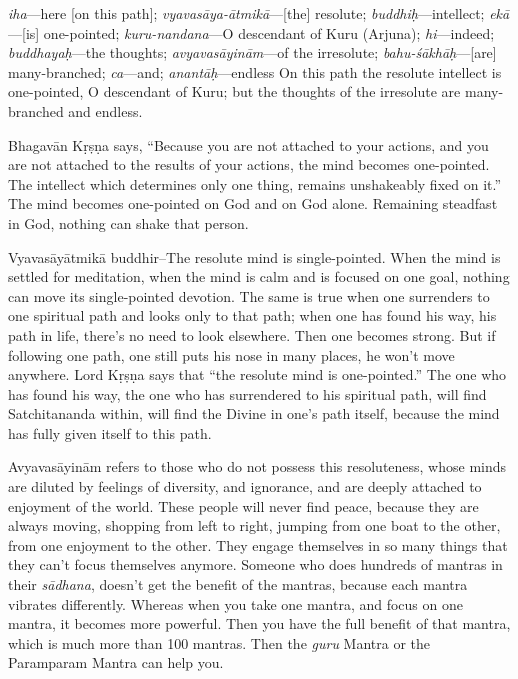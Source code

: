 {%
  \textit{iha}---here [on this path]; 
  \textit{vyavasāya-ātmikā}---[the] resolute; 
  \textit{buddhiḥ}---intellect; 
  \textit{ekā}---[is] one-pointed; 
  \textit{kuru-nandana}---O descendant of Kuru (Arjuna); 
  \textit{hi}---indeed; 
  \textit{buddhayaḥ}---the thoughts; 
  \textit{avyavasāyinām}---of the irresolute; 
  \textit{bahu-śākhāḥ}---[are] many-branched; 
  \textit{ca}---and; 
  \textit{anantāḥ}---endless
}
{%
  On this path the resolute intellect is one-pointed, O descendant of Kuru; but the thoughts of the irresolute are many-branched and endless.
}

Bhagavān Kṛṣṇa says, “Because you are not attached to your actions, and you are not attached to the results of your actions, the mind becomes one-pointed. The intellect which determines only one thing, remains unshakeably fixed on it.” The mind becomes one-pointed on God and on God alone. Remaining steadfast in God, nothing can shake that person. 

Vyavasāyātmikā buddhir--The resolute mind is single-pointed. When the mind is settled for meditation, when the mind is calm and is focused on one goal, nothing can move its single-pointed devotion. The same is true when one surrenders to one spiritual path and looks only to that path; when one has found his way, his path in life, there’s no need to look elsewhere. Then one becomes strong. But if following one path, one still puts his nose in many places, he won’t move anywhere. Lord Kṛṣṇa says that “the resolute mind is one-pointed.” The one who has found his way, the one who has surrendered to his spiritual path, will find Satchitananda within, will find the Divine in one’s path itself, because the mind has fully given itself to this path.

Avyavasāyinām refers to those who do not possess this resoluteness, whose minds are diluted by feelings of diversity, and ignorance, and are deeply attached to enjoyment of the world. These people will never find peace, because they are always moving, shopping from left to right, jumping from one boat to the other, from one enjoyment to the other. They engage themselves in so many things that they can’t focus themselves anymore. Someone who does hundreds of mantras in their \textit{sādhana}, doesn’t get the benefit of the mantras, because each mantra vibrates differently. Whereas when you take one mantra, and focus on one mantra, it becomes more powerful. Then you have the full benefit of that mantra, which is much more than 100 mantras. Then the \textit{guru} Mantra or the Paramparam Mantra can help you.

